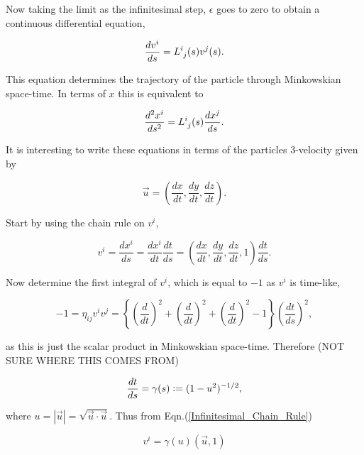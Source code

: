 \noindent Now taking the limit as the infinitesimal step, $\epsilon$ goes to zero to obtain a continuous differential equation,

\begin{equation}\label{Infinitesimal_DE_interms_v}
\frac{dv^i}{ds} = \tensor{L}{^{i}_{j}}(s) v^j (s).
\end{equation}

\noindent This equation determines the trajectory of the particle through Minkowskian space-time. In terms of $x$ this is equivalent to

\begin{equation*}
\frac{d^2 x^i}{ds^2} = \tensor{L}{^{i}_{j}}(s) \frac{d x^j}{ds}.
\end{equation*}

It is interesting to write these equations in terms of the particles $3$-velocity given by

\begin{equation*}
\vec{u} = \left( \frac{dx}{dt}, \frac{dy}{dt}, \frac{dz}{dt} \right).
\end{equation*}

\noindent Start by using the chain rule on $v^i$,

\begin{equation*}\label{Infinitesimal_Chain_Rule}
v^i = \frac{dx^i}{ds} = \frac{dx^i}{dt} \frac{dt}{ds} = \left(\frac{dx}{dt},\frac{dy}{dt},\frac{dz}{dt},1\right) \frac{dt}{ds}.
\end{equation*}

\noindent Now determine the first integral of $v^i$, which is equal to $-1$ as $v^i$ is time-like,

\begin{equation*} 
-1 = \eta_{ij} v^i v^j =  \left\{ \left( \frac{d}{dt} \right)^2  + \left( \frac{d}{dt} \right)^2  + \left( \frac{d}{dt} \right)^2 - 1  \right\} \left( \frac{dt}{ds} \right)^2,
\end{equation*} 

\noindent as this is just the scalar product in Minkowskian space-time. Therefore (NOT SURE WHERE THIS COMES FROM)

\begin{equation*}
\frac{dt}{ds} = \gamma (s) \vcentcolon = (1-u^2)^{-1/2},
\end{equation*}

\noindent where $u = |\vec{u}| = \sqrt{\vec{u} \cdot \vec{u}}$. Thus from Eqn.(\ref{Infinitesimal_Chain_Rule})

\begin{equation}\label{infinitesimal_v_interms_gamma}
v^i = \gamma(u) (\vec{u}, 1)
\end{equation}

